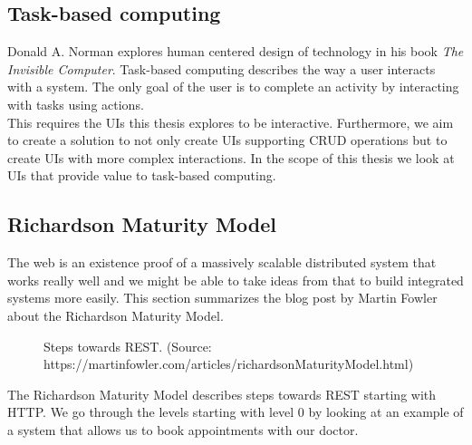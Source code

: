 \subsection{Task-based computing}
Donald A. Norman explores human centered design of technology in his book \textit{The Invisible Computer}. Task-based computing describes the way a user interacts with a system. The only goal of the user is to complete an activity by interacting with tasks using actions. \citep{invisiblecomputer} \\
This requires the UIs this thesis explores to be interactive. Furthermore, we aim to create a solution to not only create UIs supporting \gls{CRUD} operations but to create UIs with more complex interactions. In the scope of this thesis we look at UIs that provide value to task-based computing.

\subsection{Richardson Maturity Model}\label{richardsonmaturitymodel}
The web is an existence proof of a massively scalable distributed system that works really well and we might be able to take ideas from that to build integrated systems more easily. \citep{richardsonmaturitymodel} This section summarizes the blog post by Martin Fowler about the Richardson Maturity Model.

\begin{figure}[!htb]
  \caption{Steps towards REST. (Source: https://martinfowler.com/articles/richardsonMaturityModel.html)}
\end{figure}

The Richardson Maturity Model describes steps towards REST starting with HTTP. We go through the levels starting with level 0 by looking at an example of a system that allows us to book appointments with our doctor.

